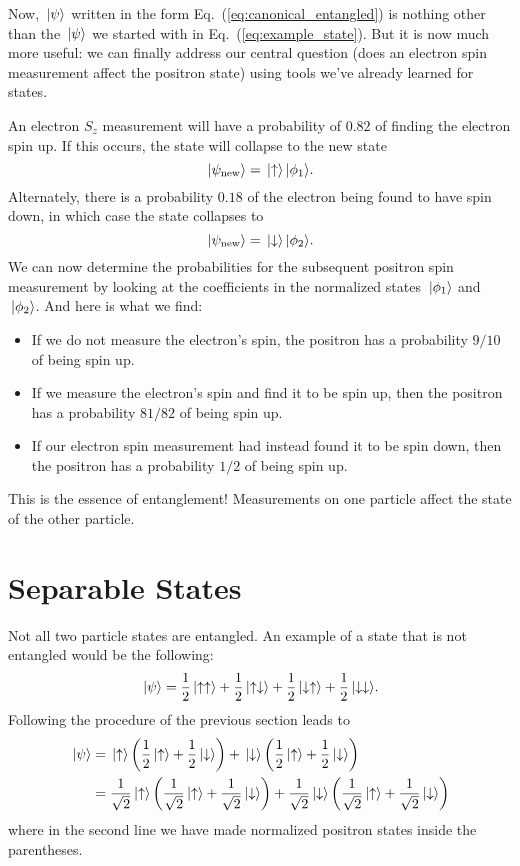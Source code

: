 Now, $\,|\mbox{$\psi$}\rangle$ written in the form
Eq.~(\ref{eq:canonical_entangled}) is nothing other than the
$\,|\mbox{$\psi$}\rangle$ we started with in Eq.~(\ref{eq:example_state}).  But it
is now much more useful: we can finally address our central question
(does an electron spin measurement affect the positron state)
using tools we've already learned for states.

An electron $S_z$ measurement will have a probability of $0.82$ of finding
the electron spin up.  If this occurs, the state will collapse to the
new state
\begin{equation}
\,|\mbox{$\psi_\text{new}$}\rangle = \,|\mbox{$\uparrow$}\rangle\,|\mbox{$\phi_1$}\rangle.
\end{equation}
Alternately, there is a probability $0.18$ of the electron being
found to have spin down, in which case the state collapses to
\begin{equation}
\,|\mbox{$\psi_\text{new}$}\rangle = \,|\mbox{$\downarrow$}\rangle\,|\mbox{$\phi_2$}\rangle.
\end{equation}
We can now determine the probabilities for the subsequent positron
spin measurement by looking at the coefficients in the normalized
states $\,|\mbox{$\phi_1$}\rangle$ and $\,|\mbox{$\phi_2$}\rangle$.  And here is what we find:
\begin{itemize}
\item If we do not measure the electron's spin, the positron has a 
probability $9/10$ of being spin up.
\item If we measure the electron's spin and find it to be spin up, then the
positron has a probability $81/82$ of being spin up.
\item If our electron spin measurement had instead found it to be spin
down, then the positron has a probability $1/2$ of being spin up.
\end{itemize}
This is the essence of entanglement!  Measurements on one particle affect
the state of the other particle.


\section{Separable States}

Not all two particle states are entangled.  An example of a state that
is not entangled would be the following:
\begin{equation}
\,|\mbox{$\psi$}\rangle = \frac{1}{2}\,|\mbox{$\uparrow\uparrow$}\rangle +
\frac{1}{2}\,|\mbox{$\uparrow\downarrow$}\rangle +
\frac{1}{2}\,|\mbox{$\downarrow\uparrow$}\rangle +
\frac{1}{2}\,|\mbox{$\downarrow\downarrow$}\rangle  .
\label{eq:separable_state}
\end{equation}
Following the procedure of the previous section leads to
\begin{align}
\,|\mbox{$\psi$}\rangle &= \,|\mbox{$\uparrow$}\rangle
\left(\frac{1}{2}\,|\mbox{$\uparrow$}\rangle +\frac{1}{2}\,|\mbox{$\downarrow$}\rangle\right)
+ \,|\mbox{$\downarrow$}\rangle
\left(\frac{1}{2}\,|\mbox{$\uparrow$}\rangle +\frac{1}{2}\,|\mbox{$\downarrow$}\rangle\right) 
\nonumber\\
&=\frac{1}{\sqrt{2}}\,|\mbox{$\uparrow$}\rangle
\left(\frac{1}{\sqrt{2}}\,|\mbox{$\uparrow$}\rangle +\frac{1}{\sqrt{2}}\,|\mbox{$\downarrow$}\rangle
 \right)
+\frac{1}{\sqrt{2}}\,|\mbox{$\downarrow$}\rangle
\left(\frac{1}{\sqrt{2}}\,|\mbox{$\uparrow$}\rangle +\frac{1}{\sqrt{2}}\,|\mbox{$\downarrow$}\rangle
 \right)
\end{align}
where in the second line we have made normalized positron states inside
the parentheses.  

